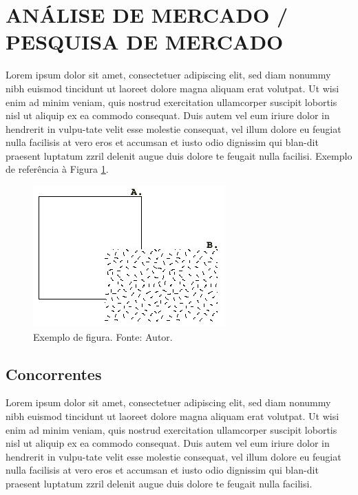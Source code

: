\section{ANÁLISE DE MERCADO / PESQUISA DE MERCADO}
\label{secao:analise_pesquisa_de_mercado}
Lorem ipsum dolor sit amet, consectetuer adipiscing elit, sed diam nonummy nibh euismod tincidunt ut laoreet dolore magna aliquam erat volutpat. Ut wisi enim ad minim veniam, quis nostrud exercitation ullamcorper suscipit lobortis nisl ut aliquip ex ea commodo consequat. Duis autem vel eum iriure dolor in hendrerit in vulpu-tate velit esse molestie consequat, vel illum dolore eu feugiat nulla facilisis at vero eros et accumsan et iusto odio dignissim qui blan-dit praesent luptatum zzril delenit augue duis dolore te feugait nulla facilisi.
Exemplo de referência à Figura \ref{figura:exemplo}.

\begin{figure}[htb]
  \includegraphics[width=0.8\columnwidth]{figure.jpg}
  \centering
  \caption{Exemplo de figura. Fonte: Autor.}
  \label{figura:exemplo}
\end{figure}

\subsection{Concorrentes}
\label{secao:concorrentes}
Lorem ipsum dolor sit amet, consectetuer adipiscing elit, sed diam nonummy nibh euismod tincidunt ut laoreet dolore magna aliquam erat volutpat. Ut wisi enim ad minim veniam, quis nostrud exercitation ullamcorper suscipit lobortis nisl ut aliquip ex ea commodo consequat. Duis autem vel eum iriure dolor in hendrerit in vulpu-tate velit esse molestie consequat, vel illum dolore eu feugiat nulla facilisis at vero eros et accumsan et iusto odio dignissim qui blan-dit praesent luptatum zzril delenit augue duis dolore te feugait nulla facilisi.

